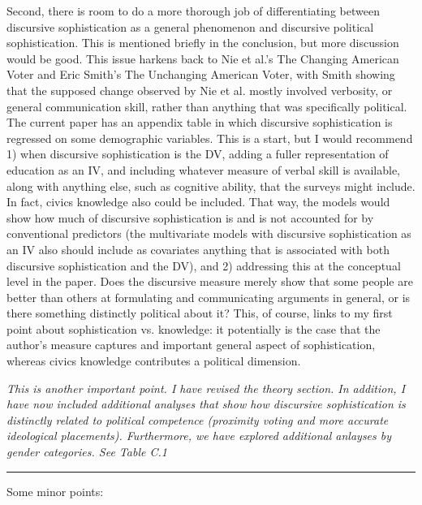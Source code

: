Second, there is room to do a more thorough job of differentiating between discursive sophistication as a general phenomenon and discursive political sophistication. This is mentioned briefly in the conclusion, but more discussion would be good. This issue harkens back to Nie et al.'s The Changing American Voter and Eric Smith's The Unchanging American Voter, with Smith showing that the supposed change observed by Nie et al. mostly involved verbosity, or general communication skill, rather than anything that was specifically political. The current paper has an appendix table in which discursive sophistication is regressed on some demographic variables. This is a start, but I would recommend 1) when discursive sophistication is the DV, adding a fuller representation of education as an IV, and including whatever measure of verbal skill is available, along with anything else, such as cognitive ability, that the surveys might include. In fact, civics knowledge also could be included. That way, the models would show how much of discursive sophistication is and is not accounted for by conventional predictors (the multivariate models with discursive sophistication as an IV also should include as covariates anything that is associated with both discursive sophistication and the DV), and 2) addressing this at the conceptual level in the paper. Does the discursive measure merely show that some people are better than others at formulating and communicating arguments in general, or is there something distinctly political about it? This, of course, links to my first point about sophistication vs. knowledge: it potentially is the case that the author's measure captures and important general aspect of sophistication, whereas civics knowledge contributes a political dimension.

\textit{This is another important point. I have revised the theory section. In addition, I have now included additional analyses that show how discursive sophistication is distinctly related to political competence (proximity voting and more accurate ideological placements). Furthermore, we have explored additional anlayses by gender categories. See Table C.1}


\rule{\linewidth}{.01cm}

Some minor points:


